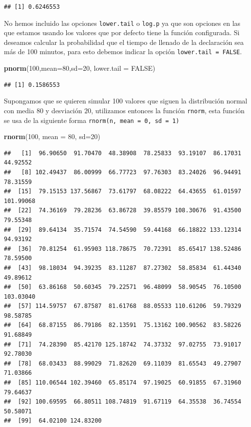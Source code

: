 \documentclass[
]{krantz}
\makeatletter
\newenvironment{Shaded}{\begin{snugshade}}{\end{snugshade}}
\newcommand{\DataTypeTok}[1]{\textcolor[rgb]{0.27,0.27,0.27}{#1}}
\newcommand{\DecValTok}[1]{\textcolor[rgb]{0.06,0.06,0.06}{#1}}
\newcommand{\KeywordTok}[1]{\textcolor[rgb]{0.27,0.27,0.27}{\textbf{#1}}}
\newcommand{\NormalTok}[1]{#1}
\newcommand{\OtherTok}[1]{\textcolor[rgb]{0.37,0.37,0.37}{#1}}
\newenvironment{kframe}{%
\medskip{}
\setlength{\fboxsep}{.8em}
 \def\at@end@of@kframe{}%
 \ifinner\ifhmode%
  \def\at@end@of@kframe{\end{minipage}}%
  \begin{minipage}{\columnwidth}%
 \fi\fi%
 \def\FrameCommand##1{\hskip\@totalleftmargin \hskip-\fboxsep
 \colorbox{shadecolor}{##1}\hskip-\fboxsep
     \hskip-\linewidth \hskip-\@totalleftmargin \hskip\columnwidth}%
 \MakeFramed {\advance\hsize-\width
   \@totalleftmargin\z@ \linewidth\hsize
   \@setminipage}}%
 {\par\unskip\endMakeFramed%
 \at@end@of@kframe}
\renewenvironment{Shaded}{\begin{kframe}}{\end{kframe}}
\makeatother
\begin{document}
\begin{verbatim}
## [1] 0.6246553
\end{verbatim}

No hemos incluido las opciones \texttt{lower.tail} o \texttt{log.p} ya que son opciones en las que estamos usando los valores que por defecto tiene la función configurada. Si deseamos calcular la probabilidad que el tiempo de llenado de la declaración sea más de 100 minutos, para esto debemos indicar la opción \texttt{lower.tail\ =\ FALSE}.

\begin{Shaded}
\begin{Highlighting}[]
\KeywordTok{pnorm}\NormalTok{(}\DecValTok{100}\NormalTok{,}\DataTypeTok{mean=}\DecValTok{80}\NormalTok{,}\DataTypeTok{sd=}\DecValTok{20}\NormalTok{, }\DataTypeTok{lower.tail =} \OtherTok{FALSE}\NormalTok{)}
\end{Highlighting}
\end{Shaded}

\begin{verbatim}
## [1] 0.1586553
\end{verbatim}

Supongamos que se quieren simular 100 valores que siguen la distribución normal con media \(80\) y desviación \(20\), utilizamos entonces la función \texttt{rnorm}, esta función se usa de la siguiente forma \texttt{rnorm(n,\ mean\ =\ 0,\ sd\ =\ 1)}

\begin{Shaded}
\begin{Highlighting}[]
\KeywordTok{rnorm}\NormalTok{(}\DecValTok{100}\NormalTok{, }\DataTypeTok{mean =} \DecValTok{80}\NormalTok{, }\DataTypeTok{sd=}\DecValTok{20}\NormalTok{)}
\end{Highlighting}
\end{Shaded}

\begin{verbatim}
##   [1]  96.90650  91.70470  48.38908  78.25833  93.19107  86.17031  44.92552
##   [8] 102.49437  86.00999  66.77723  97.76303  83.24026  96.94491  78.31559
##  [15]  79.15153 137.56867  73.61797  68.08222  64.43655  61.01597 101.99068
##  [22]  74.36169  79.28236  63.86728  39.85579 108.30676  91.43500  79.55348
##  [29]  89.64134  35.71574  74.54590  59.44168  66.18822 133.12314  94.93192
##  [36]  70.81254  61.95903 118.78675  70.72391  85.65417 138.52486  78.59500
##  [43]  98.18034  94.39235  83.11287  87.27302  58.85834  61.44340  49.89612
##  [50]  63.86168  50.60345  79.22571  96.48099  58.90545  76.10500 103.03040
##  [57] 114.59757  67.87587  81.61768  88.05533 110.61206  59.79329  98.58785
##  [64]  68.87155  86.79186  82.13591  75.13162 100.90562  83.58226  91.68849
##  [71]  74.28390  85.42170 125.18742  74.37332  97.02755  73.91017  92.78030
##  [78]  68.03433  88.99029  71.82620  69.11039  81.65543  49.27907  71.03866
##  [85] 110.06544 102.39460  65.85174  97.19025  60.91855  67.31960  79.64637
##  [92] 100.69595  66.80511 108.74819  91.67119  64.35538  36.74554  50.58071
##  [99]  64.02100 124.83200
\end{verbatim}
\end{document}
